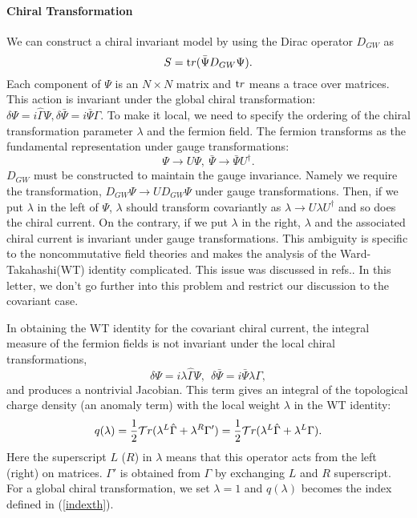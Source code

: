 \documentclass[a4paper,prl,showpacs,twocolumn]{revtex4}
\begin{document}
\paragraph{{\bf Chiral Transformation}}
We can construct a chiral invariant model 
by using the Dirac operator $D_{GW}$ as
\begin{equation}
 S= {\text tr}(\bar\Psi D_{GW} \Psi).
\end{equation}
Each component of $\Psi$ is an $N \times N$ matrix
and ${\text tr}$ means a trace over matrices.
This action is invariant under the global chiral 
transformation:
$\delta\Psi=i \hat{\Gamma}\Psi,\delta\bar\Psi=i \bar\Psi \Gamma.$
To make it local, we need to specify the 
ordering of the chiral transformation parameter $\lambda$
and the fermion field.
The fermion transforms as
 the fundamental representation under gauge transformations:
\begin{equation}
\Psi \rightarrow U \Psi, \ \bar\Psi \rightarrow \bar\Psi U^{\dagger}.
\label{gaugetr}
\end{equation}
$D_{GW}$ must be constructed to maintain the gauge invariance.
Namely we require the transformation, 
$D_{GW} \Psi \rightarrow U D_{GW} \Psi$ 
under gauge transformations.
Then, if we put $\lambda$ in the left of $\Psi$, 
$\lambda$ should transform covariantly as
$\lambda \rightarrow U \lambda U^{\dagger}$ and 
so does the chiral current.
On the contrary, if we put $\lambda$ in the right,
$\lambda$ and the associated chiral current is invariant
under gauge transformations.
This ambiguity is specific to the noncommutative field theories 
and makes the analysis of the Ward-Takahashi(WT)
identity complicated.
This issue was discussed in refs.\cite{anomaly,AIN}.
In this letter, we don't go further into this problem and
restrict our discussion to the covariant case.
\par
In obtaining the WT identity for the covariant
chiral current, the integral measure of the fermion fields
is not invariant under the local chiral transformations,
\begin{equation}
 \delta \Psi =i \lambda \hat{\Gamma} \Psi, \ \
 \delta \bar{\Psi} = i \bar{\Psi}\lambda \Gamma,
\end{equation}
and produces a nontrivial Jacobian.
This term gives an integral of the 
 topological charge density (an anomaly term)
with the local weight $\lambda$
in the WT identity:
\begin{equation}
q(\lambda)=\frac{1}{2}{\cal T}r(\lambda^L \hat{\Gamma} +\lambda^R \Gamma')
= \frac{1}{2}{\cal T}r(\lambda^L \hat{\Gamma} +\lambda^L \Gamma).
\label{topchargedensity}
\end{equation}
Here the superscript $L$ ($R$) in $\lambda$ means that this
operator acts from the left (right) on matrices.
$\Gamma'$ is obtained from $\Gamma$ 
by exchanging $L$ and $R$ superscript.
For a global chiral transformation, we set $\lambda=1$ and
$q(\lambda)$ becomes the index defined in (\ref{indexth}).
\end{document}
